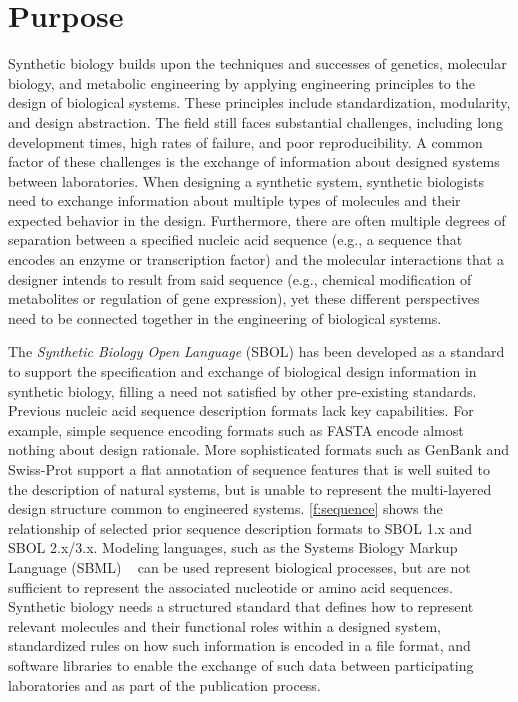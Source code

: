 \section{Purpose}

Synthetic biology builds upon the techniques and successes of genetics, molecular biology, and metabolic engineering by applying engineering principles to the design of biological systems. These principles include standardization, modularity, and design abstraction. The field still faces substantial challenges, including long development times, high rates of failure, and poor reproducibility. A common factor of these challenges is the exchange of information about designed systems between laboratories. 
When designing a synthetic system, synthetic biologists need to exchange information about multiple types of molecules and their expected behavior in the design.
Furthermore, there are often multiple degrees of separation between a specified nucleic acid sequence (e.g., a sequence that encodes an enzyme or transcription factor) and the molecular interactions that a designer intends to result from said sequence (e.g.,
chemical modification of metabolites or regulation of gene expression), yet these different perspectives need to be connected together in the engineering of biological systems.

The \emph{Synthetic Biology Open Language} (SBOL) has been developed as a standard to support the specification and exchange of biological design information in synthetic biology, filling a need not satisfied by other pre-existing standards.
Previous nucleic acid sequence description formats lack key capabilities. For example,  simple sequence encoding formats such as FASTA encode almost nothing about design rationale. More sophisticated formats such as GenBank and Swiss-Prot support a flat annotation of sequence features that is well suited to the  description of natural systems, but is unable to represent the multi-layered design structure common to engineered systems.
\ref{f:sequence} shows the relationship of selected prior sequence description formats to SBOL 1.x and SBOL 2.x/3.x.
Modeling languages, such as the Systems Biology Markup Language (SBML) ~\cite{SBML} can be used represent biological processes, but are not sufficient to represent the associated nucleotide or amino acid sequences.  
Synthetic biology needs a structured standard that defines how to represent relevant molecules and their functional roles within a designed system, standardized rules on how such information is encoded in a file format, and software libraries to enable the exchange of such data between participating laboratories and as part of the publication process. 

